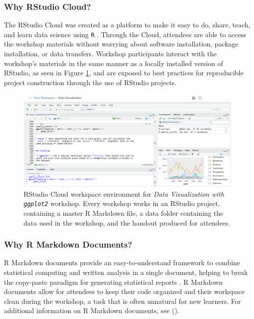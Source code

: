 \documentclass[12pt]{article}
\begin{document}
\subsubsection{Why RStudio Cloud?} 

\noindent The RStudio Cloud was created as a platform to make it easy to do,
share, teach, and learn data science using \texttt{R} \citep{RStudioCloud}. 
Through the Cloud, attendees are able to access the workshop materials without
worrying about software installation, package installation, or data transfers.
Workshop participants interact with the workshop's materials in the same manner
as a locally installed version of RStudio, as seen in Figure \ref{fig:cloud},
and are exposed to best practices for reproducible project construction through 
the use of RStudio projects. 

\begin{figure}[t!]
    \centering
    \includegraphics[width = \textwidth]{images/cloud_bigger_plot_blind.png}
    \caption{RStudio Cloud workspace environment for \emph{Data Visualization
    with \texttt{ggplot2}} workshop. Every workshop works in an RStudio project,
    containing a master R Markdown file, a data folder containing the
    data used in the workshop, and the handout produced for attendees.} 
    \label{fig:cloud}
\end{figure}

\subsubsection{Why R Markdown Documents?}

\noindent R Markdown documents provide an easy-to-understand framework to combine
statistical computing and written analysis in a single document, helping to
break the copy-paste paradigm for generating statistical reports
\citep{mine-rmarkdown}. R Markdown documents allow for attendees to keep their
code organized and their workspace clean during the workshop, a task that is 
often unnatural for new learners. For additional
information on R Markdown documents, see \citeauthor{mine-rmarkdown} 
(\citeyear{mine-rmarkdown}). 
\end{document}
